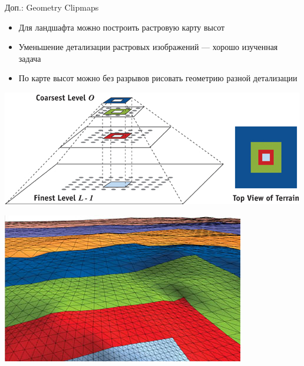 \begin{frame}{Доп.: Geometry Clipmaps}
    \begin{minipage}{.5\textwidth}
        \begin{itemize}
            \item Для ландшафта можно построить растровую карту высот
            \item Уменьшение детализации растровых изображений --- хорошо изученная задача
            \item По карте высот можно без разрывов рисовать геометрию разной детализации
        \end{itemize}
    \end{minipage}
    \begin{minipage}{.45\textwidth}
        \includegraphics[width=\textwidth]{pics/02_clipmaps_01.jpg}

        \includegraphics[width=\textwidth]{pics/02_clipmaps_02.jpg}
    \end{minipage}
\end{frame}

